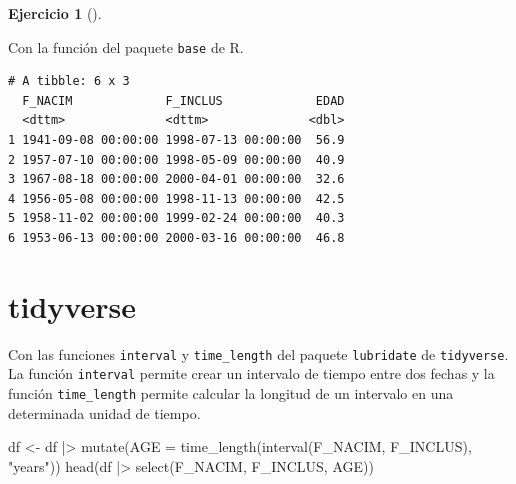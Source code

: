 \documentclass[
  spanish,
  a4paper,
]{scrreport}
\newenvironment{Shaded}{\begin{snugshade}}{\end{snugshade}}
\newcommand{\AttributeTok}[1]{\textcolor[rgb]{0.40,0.45,0.13}{#1}}
\newcommand{\DecValTok}[1]{\textcolor[rgb]{0.68,0.00,0.00}{#1}}
\newcommand{\FunctionTok}[1]{\textcolor[rgb]{0.28,0.35,0.67}{#1}}
\newcommand{\NormalTok}[1]{\textcolor[rgb]{0.00,0.23,0.31}{#1}}
\newcommand{\OtherTok}[1]{\textcolor[rgb]{0.00,0.23,0.31}{#1}}
\newcommand{\SpecialCharTok}[1]{\textcolor[rgb]{0.37,0.37,0.37}{#1}}
\newcommand{\StringTok}[1]{\textcolor[rgb]{0.13,0.47,0.30}{#1}}
\theoremstyle{definition}
\newtheorem{exercise}{Ejercicio}[chapter]
\theoremstyle{remark}
\begin{document}
\begin{exercise}[]
\begin{enumerate}
\begin{tcolorbox}
  Con la función del paquete \texttt{base} de R.

\begin{Shaded}
\end{Shaded}

\begin{verbatim}
# A tibble: 6 x 3
  F_NACIM             F_INCLUS             EDAD
  <dttm>              <dttm>              <dbl>
1 1941-09-08 00:00:00 1998-07-13 00:00:00  56.9
2 1957-07-10 00:00:00 1998-05-09 00:00:00  40.9
3 1967-08-18 00:00:00 2000-04-01 00:00:00  32.6
4 1956-05-08 00:00:00 1998-11-13 00:00:00  42.5
5 1958-11-02 00:00:00 1999-02-24 00:00:00  40.3
6 1953-06-13 00:00:00 2000-03-16 00:00:00  46.8
\end{verbatim}

  \section{tidyverse}

  Con las funciones \texttt{interval} y \texttt{time\_length} del
  paquete \texttt{lubridate} de \texttt{tidyverse}. La función
  \texttt{interval} permite crear un intervalo de tiempo entre dos
  fechas y la función \texttt{time\_length} permite calcular la longitud
  de un intervalo en una determinada unidad de tiempo.

\begin{Shaded}
\begin{Highlighting}[]
\NormalTok{df }\OtherTok{\textless{}{-}}\NormalTok{ df }\SpecialCharTok{|\textgreater{}} \FunctionTok{mutate}\NormalTok{(}\AttributeTok{AGE =} \FunctionTok{time\_length}\NormalTok{(}\FunctionTok{interval}\NormalTok{(F\_NACIM, F\_INCLUS), }\StringTok{"years"}\NormalTok{))}
\FunctionTok{head}\NormalTok{(df }\SpecialCharTok{|\textgreater{}}  \FunctionTok{select}\NormalTok{(F\_NACIM, F\_INCLUS, AGE))}
\end{Highlighting}
\end{Shaded}


\end{tcolorbox}
\end{enumerate}
\end{exercise}
\end{document}
